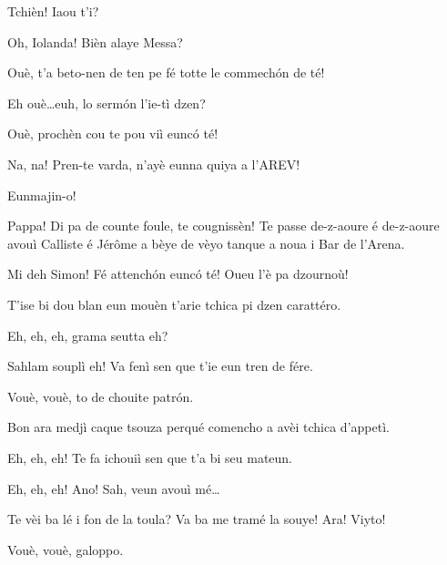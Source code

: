 \begin{drama}
\Iolandaspeaks {} Tchièn! Iaou t'i?


\Cienspeaks {} Oh, Iolanda! Bièn alaye Messa?

\Iolandaspeaks Ouè, t’a beto-nen de ten pe fé totte le commech\'on de té!

\Cienspeaks Eh ouè\ldots euh, lo serm\'on l'ie-tì dzen?

\Iolandaspeaks  Ouè, prochèn cou te pou viì eunc\'o té!

\Cienspeaks Na, na! Pren-te varda, n’ayè eunna quiya a l’AREV!

\Iolandaspeaks Eunmajin-o!

\Simonspeaks Pappa! Di pa de counte foule, te cougnissèn! Te passe de-z-aoure é de-z-aoure avouì Calliste é Jérôme a bèye de vèyo tanque a noua i Bar de l’Arena.

\Cienspeaks Mi deh Simon! Fé attench\'on eunc\'o té! Oueu l’è pa dzournoù!

\Iolandaspeaks T’ise bi dou blan \vino eun mouèn t’arie tchica pi dzen carattéro.

\Sahlammspeaks {}  Eh, eh, eh, grama seutta eh?

\Cienspeaks Sahlam souplì eh! Va fenì sen que t’ie eun tren de fére.

\Sahlammspeaks Vouè, vouè, to de chouite patr\'on.


\Cienspeaks {} Bon ara medjì caque tsouza perqué comencho a avèi tchica d’appetì.

\Sahlammspeaks {} Eh, eh, eh! Te fa ichouiì sen que t’a bi seu mateun. 


\Cienspeaks {} Eh, eh, eh! Ano! Sah, veun avouì mé\ldots


\Cienspeaks {} Te vèi ba lé i fon de la toula? Va ba me tramé la souye! Ara! Viyto! 

\Sahlammspeaks Vouè, vouè, galoppo\galoppe.


\end{drama}
